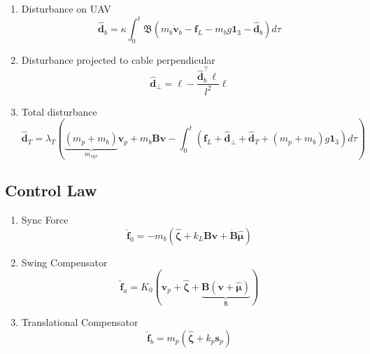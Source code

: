 \documentclass[12pt]{article}
\begin{document}
\begin{enumerate}
    \item Disturbance on UAV
          \begin{equation}
              \hat{\mathbf{d}}_b = \kappa\int_0^t\boldsymbol{\mathfrak{B}}\left(m_b\dot{\mathbf{v}}_b - \mathbf{f}_L - m_bg\mathbf{1}_3 - \hat{\mathbf{d}}_b\right)d\tau
          \end{equation}

    \item Disturbance projected to cable perpendicular
          \begin{equation}
              \hat{\mathbf{d}}_\perp = \boldsymbol{\ell} - \frac{\hat{\mathbf{d}}_b^\top\boldsymbol{\ell}}{l^2}\boldsymbol{\ell}
          \end{equation}

    \item Total disturbance
          \begin{equation}
              \hat{\mathbf{d}}_T = \lambda_T\left(\underbrace{(m_p+m_b)}_{m_{sys}}\mathbf{v}_p + m_b\mathbf{B}\mathbf{v} - \int_0^t\left(\mathbf{f}_L + \hat{\mathbf{d}}_\perp + \hat{\mathbf{d}}_T + \left(m_p+m_b\right)g\mathbf{1}_3\right)d\tau\right)
          \end{equation}
\end{enumerate}

\subsection{Control Law}

\begin{enumerate}
    \item Sync Force
          \begin{equation}
              \hat{\mathbf{f}}_0 = -m_b\left(\hat{\boldsymbol{\zeta}} + k_L\mathbf{B}\mathbf{v} + \dot{\mathbf{B}}\hat{\boldsymbol{\mu}}\right)
          \end{equation}

    \item Swing Compensator
          \begin{equation}
              \hat{\mathbf{f}}_a = K_0\left(\mathbf{v}_p + \hat{\boldsymbol{\zeta}} + \underbrace{\mathbf{B}\left(\mathbf{v} + \hat{\boldsymbol{\mu}}\right)}_{\mathtt{R}}\right)
          \end{equation}

    \item Translational Compensator
          \begin{equation}
              \hat{\mathbf{f}}_b = m_p\left(\hat{\boldsymbol{\zeta}} + k_p\mathbf{s}_p\right)
          \end{equation}
\end{enumerate}
\end{document}
